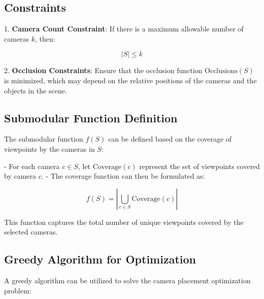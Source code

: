 \subsection*{Constraints}

1. \textbf{Camera Count Constraint}: If there is a maximum allowable number of cameras \( k \), then:

\[
|S| \leq k
\]

2. \textbf{Occlusion Constraints}: Ensure that the occlusion function \( \text{Occlusions}(S) \) is minimized, which may depend on the relative positions of the cameras and the objects in the scene.

\subsection*{Submodular Function Definition}

The submodular function \( f(S) \) can be defined based on the coverage of viewpoints by the cameras in \( S \):

- For each camera \( c \in S \), let \( \text{Coverage}(c) \) represent the set of viewpoints covered by camera \( c \).
- The coverage function can then be formulated as:

\[
f(S) = |\bigcup_{c \in S} \text{Coverage}(c)|
\]

This function captures the total number of unique viewpoints covered by the selected cameras.

\subsection*{Greedy Algorithm for Optimization}

A greedy algorithm can be utilized to solve the camera placement optimization problem:

